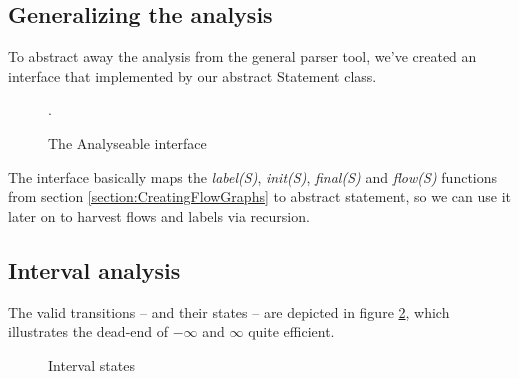 \subsection{Generalizing the analysis}
To abstract away the analysis from the general parser tool, we've created an interface that implemented by our abstract Statement class.
\begin{figure}
\centering
{}
\caption{The Analyseable interface}
\label{fig:analysable_basic_definition}.
\end{figure}The interface basically maps the \textit{label(S)}, \textit{init(S)}, \textit{final(S)} and \textit{flow(S)} functions from section \ref{section:CreatingFlowGraphs} to abstract statement, so we can use it later on to harvest flows and labels via recursion.

\subsection{Interval analysis}

The valid transitions -- and their states -- are depicted in figure \ref{figure:interval_states}, which illustrates the dead-end of $-\infty$ and $\infty$ quite efficient.
\begin{figure}
\centering
\caption{Interval states}
\label{figure:interval_states}
\end{figure}
